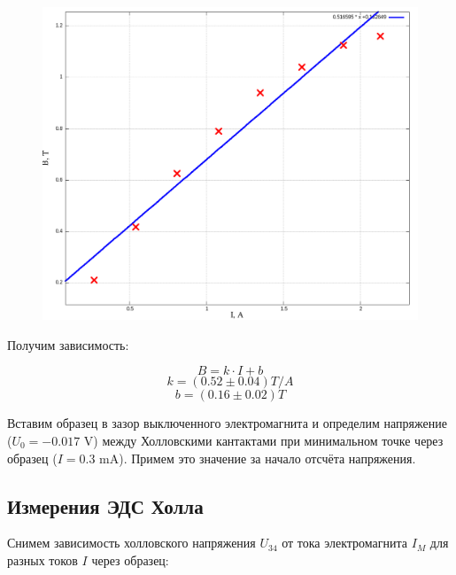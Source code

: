 \documentclass{article}
\begin{document}
\begin{figure} [H]
    \centering
    \includegraphics[width=\textwidth]{calibr_line.png}
\end{figure}

Получим зависимость:

\[ B = k\cdot I + b \]
\[ k  = (0.52 \pm 0.04) T/A \]
\[ b = (0.16 \pm 0.02) T \]

Вставим образец в зазор выключенного электромагнита и определим напряжение (\( U_0 = -0.017 \) V) между
Холловскими кантактами при минимальном точке через образец (\( I = 0.3 \) mA). Примем это значение за начало
отсчёта напряжения.

\subsection{Измерения ЭДС Холла}

Снимем зависимость холловского напряжения \(U_{34}\) от тока электромагнита \(I_{M}\) для разных токов \(I\)
через образец:
\end{document}
